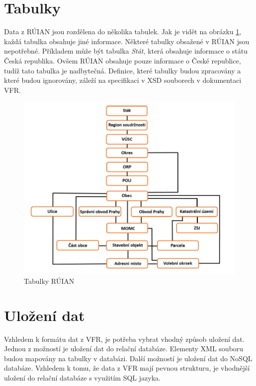 \documentclass[czech, kiv, ba, he, iso690alph, pdf]{fasthesis}
\begin{document}
\section{Tabulky}
Data z RÚIAN jsou rozdělena do několika tabulek.
Jak je vidět na obrázku \ref{fig:ruian_tables}, každá tabulka obsahuje jiné informace.
Některé tabulky obsažené v RÚIAN jsou nepotřebné. 
Příkladem může být tabulka \textit{Stát}, která obsahuje informace o státu Česká republika.
Ovšem RÚIAN obsahuje pouze informace o České republice, tudíž tato tabulka je nadbytečná.
Definice, které tabulky budou zpracovány a které budou ignorovány, záleží na specifikaci v XSD souborech v dokumentaci VFR. 

\pagebreak
\begin{figure}[H]
    \centering
    \includegraphics[width=\textwidth]{figures/ruian_tables.png}
    \caption{Tabulky RÚIAN}
    \label{fig:ruian_tables}
\end{figure}

\section{Uložení dat}
Vzhledem k formátu dat z VFR, je potřeba vybrat vhodný způsob uložení dat.
Jednou z možností je uložení dat do relační databáze.
Elementy XML souboru budou mapovány na tabulky v databázi.
Další možností je uložení dat do NoSQL databáze.
Vzhledem k tomu, že data z VFR mají pevnou strukturu, je vhodnější uložení do relační databáze s využitím SQL jazyka.
\end{document}
